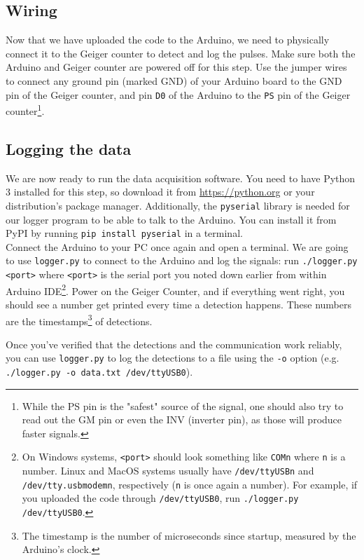 \documentclass[11pt]{article}
\begin{document}
\subsection{Wiring}
\label{sec:orgfc5829e}
Now that we have uploaded the code to the Arduino, we need to physically connect it to the Geiger counter to detect and log the pulses. Make sure both the Arduino and Geiger counter are powered off for this step. Use the jumper wires to connect any ground pin (marked GND) of your Arduino board to the GND pin of the Geiger counter, and pin \texttt{D0} of the Arduino to the \texttt{PS} pin of the Geiger counter\footnote{While the PS pin is the "safest" source of the signal, one should also try to read out the GM pin or even the INV (inverter pin), as those will produce faster signals.}.

\subsection{Logging the data}
\label{sec:orgb4c074b}
We are now ready to run the data acquisition software. You need to have Python 3 installed for this step, so download it from \url{https://python.org} or your distribution's package manager. Additionally, the \texttt{pyserial} library is needed for our logger program to be able to talk to the Arduino. You can install it from PyPI by running \texttt{pip install pyserial} in a terminal.\\
Connect the Arduino to your PC once again and open a terminal. We are going to use \texttt{logger.py} to connect to the Arduino and log the signals: run \texttt{./logger.py <port>} where \texttt{<port>} is the serial port you noted down earlier from within Arduino IDE\footnote{On Windows systems, \texttt{<port>} should look something like \texttt{COMn} where \texttt{n} is a number. Linux and MacOS systems usually have \texttt{/dev/ttyUSBn} and \texttt{/dev/tty.usbmodemn}, respectively (\texttt{n} is once again a number). For example, if you uploaded the code through \texttt{/dev/ttyUSB0}, run \texttt{./logger.py /dev/ttyUSB0}.}. Power on the Geiger Counter, and if everything went right, you should see a number get printed every time a detection happens. These numbers are the timestamps\footnote{The timestamp is the number of microseconds since startup, measured by the Arduino's clock.} of detections.

Once you've verified that the detections and the communication work reliably, you can use \texttt{logger.py} to log the detections to a file using the \texttt{-o} option (e.g. \texttt{./logger.py -o data.txt /dev/ttyUSB0}).
\end{document}
